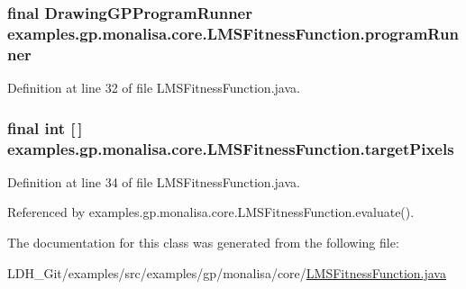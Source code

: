 \hypertarget{classexamples_1_1gp_1_1monalisa_1_1core_1_1_l_m_s_fitness_function_af834bb4fcc8e4e34fad814f78c8ed1f5}{
\subsubsection[{program\-Runner}]{\setlength{\rightskip}{0pt plus 5cm}final {\bf Drawing\-G\-P\-Program\-Runner} examples.\-gp.\-monalisa.\-core.\-L\-M\-S\-Fitness\-Function.\-program\-Runner\hspace{0.3cm}{\ttfamily [private]}}}\label{classexamples_1_1gp_1_1monalisa_1_1core_1_1_l_m_s_fitness_function_af834bb4fcc8e4e34fad814f78c8ed1f5}


Definition at line 32 of file L\-M\-S\-Fitness\-Function.\-java.

\hypertarget{classexamples_1_1gp_1_1monalisa_1_1core_1_1_l_m_s_fitness_function_aee3988243075e939f5693547a0d012e9}{
\subsubsection[{target\-Pixels}]{\setlength{\rightskip}{0pt plus 5cm}final int \mbox{[}$\,$\mbox{]} examples.\-gp.\-monalisa.\-core.\-L\-M\-S\-Fitness\-Function.\-target\-Pixels\hspace{0.3cm}{\ttfamily [private]}}}\label{classexamples_1_1gp_1_1monalisa_1_1core_1_1_l_m_s_fitness_function_aee3988243075e939f5693547a0d012e9}


Definition at line 34 of file L\-M\-S\-Fitness\-Function.\-java.



Referenced by examples.\-gp.\-monalisa.\-core.\-L\-M\-S\-Fitness\-Function.\-evaluate().



The documentation for this class was generated from the following file\-:\begin{DoxyCompactItemize}
\item 
L\-D\-H\-\_\-\-Git/examples/src/examples/gp/monalisa/core/\hyperlink{gp_2monalisa_2core_2_l_m_s_fitness_function_8java}{L\-M\-S\-Fitness\-Function.\-java}\end{DoxyCompactItemize}
